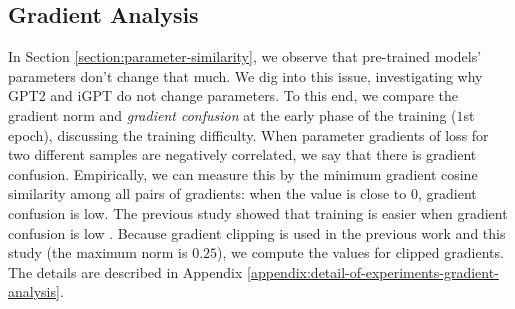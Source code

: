 \subsection{Gradient Analysis}
\label{section:gradient-analysis}
In Section \ref{section:parameter-similarity}, we observe that pre-trained models' parameters don't change that much. We dig into this issue,  investigating why GPT2 and iGPT do not change parameters. To this end, we compare the gradient norm and \textit{gradient confusion} \cite{sankararaman2020impact} at the early phase of the training ($1$st epoch), discussing the training difficulty. When parameter gradients of loss for two different samples are negatively correlated, we say that there is gradient confusion. Empirically, we can measure this by the minimum gradient cosine similarity among all pairs of gradients: when the 
value is close to 0, gradient confusion is low. The previous study showed that training is easier when gradient confusion is low \cite{sankararaman2020impact}. Because gradient clipping is used in the previous work \cite{reid2022can} and this study (the maximum norm is $0.25$), we compute the values for clipped gradients. The details are described in Appendix \ref{appendix:detail-of-experiments-gradient-analysis}.

